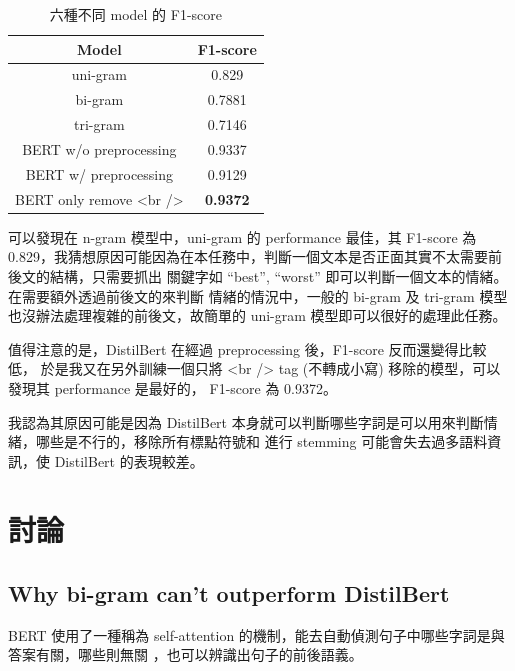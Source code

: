 \documentclass{article}[12pt]
\begin{document}
\begin{table}[H]
    \centering
    \caption{六種不同 model 的 F1-score}
    \begin{tabular}{@{}cc@{}}
    \toprule
    \textbf{Model}                                 & \textbf{F1-score} \\ \midrule
    uni-gram                                       & 0.829             \\
    bi-gram                                        & 0.7881            \\
    tri-gram                                       & 0.7146            \\
    BERT w/o preprocessing                         & 0.9337   \\
    BERT w/ preprocessing                          & 0.9129            \\
    BERT only remove \textless{}br /\textgreater{} & \textbf{0.9372}            \\ \bottomrule
    \end{tabular}
\end{table}

可以發現在 n-gram 模型中，uni-gram 的 performance 最佳，其 F1-score 為 0.829，我猜想原因可能因為在本任務中，判斷一個文本是否正面其實不太需要前後文的結構，只需要抓出
關鍵字如 ``best'', ``worst'' 即可以判斷一個文本的情緒。在需要額外透過前後文的來判斷
情緒的情況中，一般的 bi-gram 及 tri-gram 模型也沒辦法處理複雜的前後文，故簡單的 uni-gram 
模型即可以很好的處理此任務。

值得注意的是，DistilBert 在經過 preprocessing 後，F1-score 反而還變得比較低，
於是我又在另外訓練一個只將 <br /> tag (不轉成小寫) 移除的模型，可以發現其 performance 是最好的，
F1-score 為 0.9372。

我認為其原因可能是因為 DistilBert 本身就可以判斷哪些字詞是可以用來判斷情緒，哪些是不行的，移除所有標點符號和
進行 stemming 可能會失去過多語料資訊，使 DistilBert 的表現較差。


\section{討論}
\subsection{Why bi-gram can't outperform DistilBert}

BERT 使用了一種稱為 self-attention 的機制，能去自動偵測句子中哪些字詞是與答案有關，哪些則無關
，也可以辨識出句子的前後語義。
\end{document}
